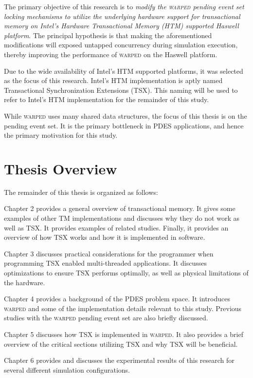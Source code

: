 \documentclass[11pt]{book}
\begin{document}
The primary objective of this research is to \emph{modify the \textsc{warped} pending event set
  locking mechanisms to utilize the underlying hardware support for transactional memory
  on Intel's Hardware Transactional Memory (HTM) supported Haswell platform}.  The
principal hypothesis is that making the aforementioned modifications will exposed untapped
concurrency during simulation execution, thereby improving the performance of \textsc{warped} on
the Haswell platform.

Due to the wide availability of Intel's HTM supported platforms, it was selected as the
focus of this research.  Intel's HTM implementation is aptly named Transactional
Synchronization Extensions (TSX).  This naming will be used to refer to Intel's HTM
implementation for the remainder of this study.

While \textsc{warped} uses many shared data structures, the focus of this thesis is on the
pending event set.  It is the primary bottleneck in PDES applications, and hence the
primary motivation for this study.

\section{Thesis Overview}

The remainder of this thesis is organized as follows:

Chapter 2 provides a general overview of transactional memory.  It gives some examples of
other TM implementations and discusses why they do not work as well as TSX.  It provides
examples of related studies.  Finally, it provides an overview of how TSX works and how it
is implemented in software.

Chapter 3 discusses practical considerations for the programmer when programming TSX
enabled multi-threaded applications.  It discusses optimizations to ensure TSX performs
optimally, as well as physical limitations of the hardware.

Chapter 4 provides a background of the PDES problem space.  It introduces \textsc{warped}
and some of the implementation details relevant to this study.  Previous studies with the
\textsc{warped} pending event set are also briefly discussed.

Chapter 5 discusses how TSX is implemented in \textsc{warped}.  It also provides
a brief overview of the critical sections utilizing TSX and why TSX will be
beneficial.

Chapter 6 provides and discusses the experimental results of this research for several
different simulation configurations.
\end{document}
